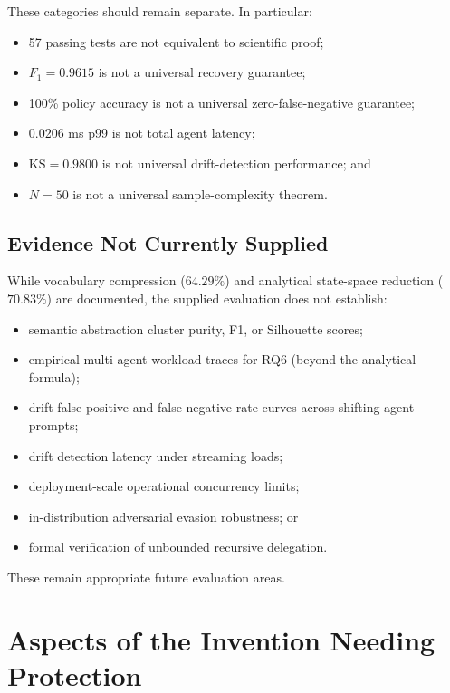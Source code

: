 \documentclass[11pt,a4paper]{article}
\begin{document}
These categories should remain separate. In particular:

\begin{itemize}
\item 57 passing tests are not equivalent to scientific proof;
\item $F_1=0.9615$ is not a universal recovery guarantee;
\item 100\% policy accuracy is not a universal zero-false-negative guarantee;
\item 0.0206 ms p99 is not total agent latency;
\item $\mathrm{KS}=0.9800$ is not universal drift-detection performance; and
\item $N=50$ is not a universal sample-complexity theorem.
\end{itemize}

\subsection{Evidence Not Currently Supplied}

While vocabulary compression ($64.29\%$) and analytical state-space reduction ($70.83\%$)
are documented, the supplied evaluation does not establish:

\begin{itemize}
\item semantic abstraction cluster purity, F1, or Silhouette scores;
\item empirical multi-agent workload traces for RQ6 (beyond the analytical formula);
\item drift false-positive and false-negative rate curves across shifting agent prompts;
\item drift detection latency under streaming loads;
\item deployment-scale operational concurrency limits;
\item in-distribution adversarial evasion robustness; or
\item formal verification of unbounded recursive delegation.
\end{itemize}

These remain appropriate future evaluation areas.

\section{Aspects of the Invention Needing Protection}
\end{document}
